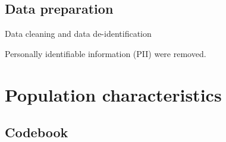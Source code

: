 \documentclass[
  letterpaper,
  DIV=11,
  numbers=noendperiod,
  oneside]{scrreprt}
\begin{document}
\hypertarget{data-preparation}{%
\subsection{Data preparation}\label{data-preparation}}

Data cleaning and data de-identification

Personally identifiable information (PII) were removed.

\hypertarget{population-characteristics}{%
\section{Population characteristics}\label{population-characteristics}}

\hypertarget{codebook}{%
\subsection{Codebook}\label{codebook}}
\end{document}
